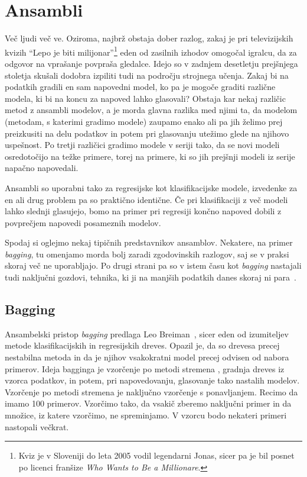 \chapter{Ansambli}

Več ljudi več ve. Oziroma, najbrž obstaja dober razlog, zakaj je pri televizijskih kvizih ``Lepo je biti milijonar''\footnote{Kviz je v Sloveniji do leta 2005 vodil legendarni Jonas, sicer pa je bil posnet po licenci franšize {\em Who Wants to Be a Millionare}.} eden od zasilnih izhodov omogočal igralcu, da za odgovor na vprašanje povpraša gledalce. Idejo so v zadnjem desetletju prejšnjega stoletja skušali dodobra izpiliti tudi na področju strojnega učenja. Zakaj bi na podatkih gradili en sam napovedni model, ko pa je mogoče graditi različne modela, ki bi na koncu za napoved lahko glasovali? Obstaja kar nekaj različic metod z ansambli modelov, a je morda glavna razlika med njimi ta, da modelom (metodam, s katerimi gradimo modele) zaupamo enako ali pa jih želimo prej preizkusiti na delu podatkov in potem pri glasovanju utežimo glede na njihovo uspešnost. Po tretji različici gradimo modele v seriji tako, da se novi modeli osredotočijo na težke primere, torej na primere, ki so jih prejšnji modeli iz serije napačno napovedali.

Ansambli so uporabni tako za regresijske kot klasifikacijske modele, izvedenke za en ali drug problem pa so praktično identične. Če pri klasifikaciji z več modeli lahko slednji glasujejo, bomo na primer pri regresiji končno napoved dobili z povprečjem napovedi posameznih modelov.

Spodaj si oglejmo nekaj tipičnih predstavnikov ansamblov. Nekatere, na primer {\em bagging}, tu omenjamo morda bolj zaradi zgodovinskih razlogov, saj se v praksi skoraj več ne uporabljajo. Po drugi strani pa so v istem času kot {\em bagging} nastajali tudi naključni gozdovi, tehnika, ki ji na manjših podatkih danes skoraj ni para~\cite{Fernandez-Delgado2014}.

\section{Bagging}

Ansambelski pristop {\em bagging} predlaga Leo Breiman~\cite{Breiman1996a}, sicer eden od izumiteljev metode klasifikacijskih in regresijskih dreves. Opazil je, da so drevesa precej nestabilna metoda in da je njihov vsakokratni model precej odvisen od nabora primerov. Ideja bagginga  je vzorčenje po metodi stremena , gradnja dreves iz vzorca podatkov, in potem, pri napovedovanju, glasovanje tako nastalih modelov. Vzorčenje po metodi stremena je naključno vzorčenje s ponavljanjem. Recimo da imamo 100 primerov. Vzorčimo tako, da vsakič zberemo naključni primer in da množice, iz katere vzorčimo, ne spreminjamo. V vzorcu bodo nekateri primeri nastopali večkrat.

